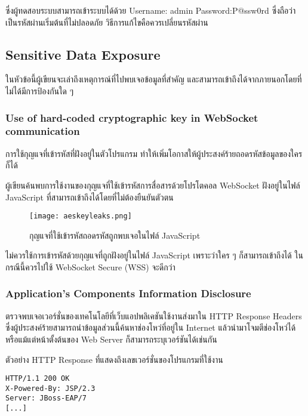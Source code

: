 ซึ่งผู้ทดสอบระบบสามารถเข้าระบบได้ด้วย Username: admin Password:P@ssw0rd ซึ่งถือว่าเป็นรหัสผ่านเริ่มต้นที่ไม่ปลอดภัย วิธีการแก้ไขคือควรเปลี่ยนรหัสผ่าน

\subsection{Sensitive Data Exposure}

ในหัวข้อนี้ผู้เขียนจะเล่าถึงเหตุการณ์ที่ไปพบเจอข้อมูลที่สำคัญ และสามารถเข้าถึงได้จากภายนอกโดยที่ไม่ได้มีการป้องกันใด ๆ
 
 
\subsubsection{Use of hard-coded cryptographic key in WebSocket communication}

การใช้กุญแจที่เข้ารหัสที่ฝังอยู่ในตัวโปรแกรม ทำให้เพิ่มโอกาสให้ผู้ประสงค์ร้ายถอดรหัสข้อมูลของใครก็ได้

ผู้เขียนค้นพบการใช้งานของกุญแจที่ใช้เข้ารหัสการสื่อสารด้วยโปรโตคอล WebSocket ฝังอยู่ในไฟล์ JavaScript ที่สามารถเข้าถึงได้โดยที่ไม่ต้องยืนยันตัวตน

 \begin{figure}[h]
	\centering
	\texttt{[image: aeskeyleaks.png]}
	\caption{กุญแจที่ใช้เข้ารหัสถอดรหัสถูกพบเจอในไฟล์ JavaScript}
	\label{Fig:aeskeyleaks.png}
\end{figure}
 
 ไม่ควรใช้การเข้ารหัสด้วยกุญแจที่ถูกฝังอยู่ในไฟล์ JavaScript เพราะว่าใคร ๆ ก็สามารถเข้าถึงได้ ในกรณีนี้ควรไปใช้ WebSocket Secure (WSS) จะดีกว่า
 
 \subsubsection{Application's Components Information Disclosure}
 
 ตรวจพบเจอเวอร์ชั่นของเทคโนโลยีที่เว็บแอปพลิเคชันใช้งานส่งมาใน HTTP Response Headers ซึ่งผู้ประสงค์ร้ายสามารถนำข้อมูลส่วนนี้ค้นหาช่องโหว่ที่อยู่ใน Internet แล้วนำมาโจมตีช่องโหว่ได้ หรือแม้แต่หน้าตั้งต้นของ Web Server ก็สามารถระบุเวอร์ชันได้เช่นกัน
 
 ตัวอย่าง HTTP Response ที่แสดงถึงเลขเวอร์ชั่นของโปรแกรมที่ใช้งาน
 
 \begin{lstlisting}[numbers=none] 
HTTP/1.1 200 OK
X-Powered-By: JSP/2.3
Server: JBoss-EAP/7
[...]
 \end{lstlisting}
 
